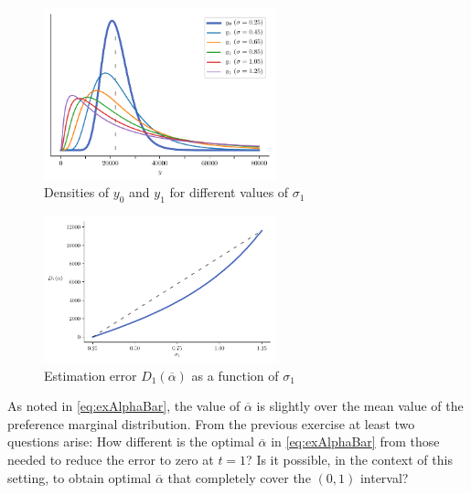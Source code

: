 \documentclass[english, a4paper, 12pt]{article}
\begin{document}
	\begin{figure}
		\caption{Densities of $y_{0}$ and $y_{1}$ for different values of $\sigma_{1}$}
		\label{fig:LogNormalSigma1}
		\includegraphics[width = 0.6\textwidth]{RAwageDistribs}
	\end{figure}
	
	\begin{figure}
		\caption{Estimation error $D_{1}(\overline{\alpha})$ as a function of $\sigma_{1}$}
		\label{fig:RADiffPlot}
		\includegraphics[width = 0.6\textwidth]{RAdiffPlot}
	\end{figure}

As noted in \eqref{eq:exAlphaBar}, the value of $\overline{\alpha}$ is slightly over the mean value of the preference marginal distribution. From the previous exercise at least two questions arise: How different is the optimal $\overline{\alpha}$ in \eqref{eq:exAlphaBar} from those needed to reduce the error to zero at $t = 1$? Is it possible, in the context of this setting, to obtain optimal $\overline{\alpha}$ that completely cover the $(0,1)$ interval?
\end{document}

